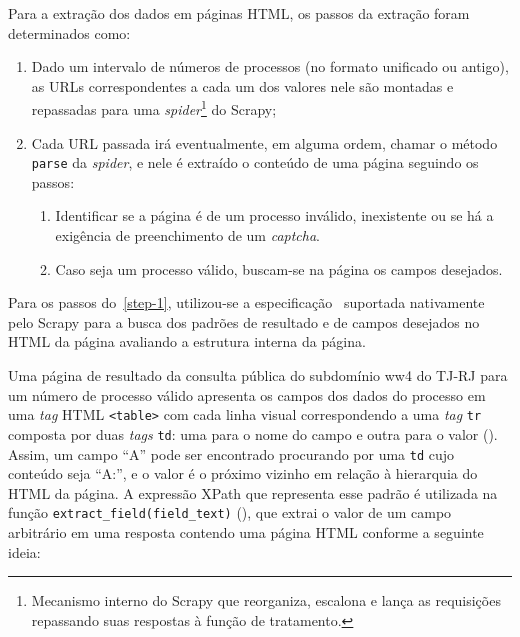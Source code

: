 Para a extração dos dados em páginas HTML, os passos da extração foram
determinados como:

\begin{enumerate}
    \item Dado um intervalo de números de processos (no formato unificado ou
        antigo), as URLs correspondentes a cada um dos valores nele são
        montadas e repassadas para uma \textit{spider}\footnote{Mecanismo
        interno do Scrapy que reorganiza, escalona e lança as requisições
        repassando suas respostas à função de tratamento.} do Scrapy;
    \item \label{step-1} Cada URL passada irá eventualmente, em alguma ordem, chamar o método
        \texttt{parse} da \textit{spider}, e nele é extraído o conteúdo de uma
        página seguindo os passos:

        \begin{enumerate}
            \item Identificar se a página é de um processo inválido,
                inexistente ou se há a exigência de preenchimento de um
                \textit{captcha}.
            \item Caso seja um processo válido, buscam-se na página os campos
                desejados.
        \end{enumerate}
\end{enumerate}

Para os passos do~\cref{step-1}, utilizou-se a especificação~\cite{spec:xpath}
suportada nativamente pelo Scrapy para a busca dos padrões de resultado e de
campos desejados no HTML da página avaliando a estrutura interna da página.

Uma página de resultado da consulta pública do subdomínio ww4 do TJ-RJ para um
número de processo válido apresenta os campos dos dados do processo em uma
\textit{tag} HTML \texttt{<table>} com cada linha visual correspondendo a uma
\textit{tag} \texttt{tr} composta por duas \textit{tags} \texttt{td}: uma para
o nome do campo e outra para o valor (). Assim, um campo
``A'' pode ser encontrado procurando por uma \texttt{td} cujo conteúdo seja
``A:'', e o valor é o próximo vizinho em relação à hierarquia do HTML da
página. A expressão XPath que representa esse padrão é utilizada na função
\texttt{extract_field(field_text)} (), que
extrai o valor de um campo arbitrário em uma resposta contendo uma página HTML
conforme a seguinte ideia:

